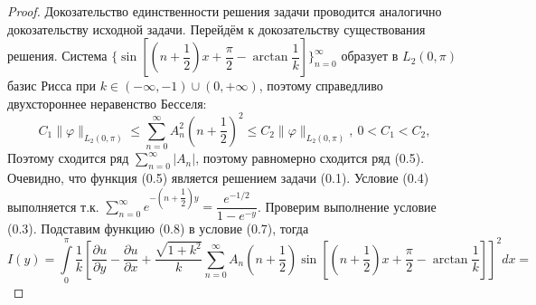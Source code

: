 \documentclass[10pt, a4paper]{extarticle}
\numberwithin{equation}{section}
\numberwithin{lemma}{section}
\numberwithin{definition}{section}
\numberwithin{notabene}{section}
\numberwithin{corollary}{section}
\begin{document}
	\begin{proof}
		Докозательство единственности решения задачи проводится аналогично докозательству исходной задачи. \newline
		Перейдём к докозательству существования решения. \newline
		Система $\{\sin{\left[\left(n +\dfrac12\right)x + \dfrac\pi2 - \arctan{\dfrac{1}{k}}\right]}\}_{n=0}^{\infty}$ образует в $L_2(0,\pi)$ базис Рисса при $k \in (-\infty, -1) \cup (0, +\infty)$, поэтому справедливо двухстороннее неравенство Бесселя:
		\begin{equation*}
			C_1 \|\varphi \|_{L_2(0,\pi)} \leq \sum\limits_{n=0}^{\infty} A_n^2 \left(n+\dfrac12\right)^2 \leq 	C_2 \|\varphi \|_{L_2(0,\pi)} , \ 0 < C_1 < C_2,
		\end{equation*}
		Поэтому сходится ряд $\sum\limits_{n=0}^{\infty} |A_n|$, поэтому  равномерно сходится ряд (0.5). Очевидно, что функция (0.5) является решением задачи (0.1). Условие (0.4) выполняется т.к. $\sum\limits_{n=0}^{\infty} e^{-\left(n+\dfrac12\right)y} = \dfrac{e^{-1/2}}{1 - e^{-y}}$. Проверим выполнение условие (0.3).
		Подставим функцию (0.8) в условие (0.7), тогда
		\begin{equation*}
			I(y) = \int\limits_0^\pi \dfrac{1}{k}\left[\dfrac{\partial u}{\partial y} - \dfrac{\partial u}{\partial x} +  \dfrac{\sqrt{1+k^2}}{k} \sum\limits_{n=0}^{\infty} A_n \left(n + \dfrac12 \right) \sin{\left[\left(n +\dfrac12\right)x + \dfrac\pi2 - \arctan{\dfrac{1}{k}}\right]}\right]^2 dx = 
		\end{equation*}
		

\end{proof}
\end{document}
